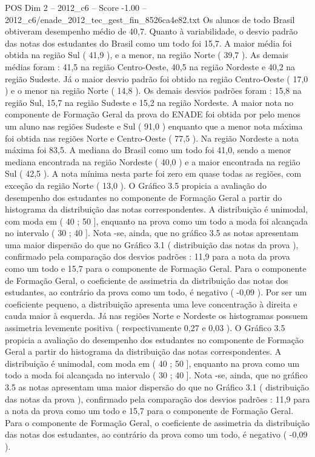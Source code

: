 \begin{textsample}{POS Dim 2 – 2012\_c6 – Score -1.00 – 2012\_c6/enade\_2012\_tec\_gest\_fin\_8526ca4e82.txt}
Os alunos de todo Brasil obtiveram desempenho médio de 40,7.
Quanto à variabilidade, o desvio padrão das notas dos estudantes do Brasil como um todo foi 15,7.
A maior média foi obtida na região Sul ( 41,9 ), e a menor, na região Norte ( 39,7 ).
As demais médias foram : 41,5 na região Centro-Oeste, 40,5 na região Nordeste e 40,2 na região Sudeste.
Já o maior desvio padrão foi obtido na região Centro-Oeste ( 17,0 ) e o menor na região Norte ( 14,8 ).
Os demais desvios padrões foram : 15,8 na região Sul, 15,7 na região Sudeste e 15,2 na região Nordeste.
A maior nota no componente de Formação Geral da prova do ENADE foi obtida por pelo menos um aluno nas regiões Sudeste e Sul ( 91,0 ) enquanto que a menor nota máxima foi obtida nas regiões Norte e Centro-Oeste ( 77,5 ).
Na região Nordeste a nota máxima foi 83,5.
A mediana do Brasil como um todo foi 41,0, sendo a menor mediana encontrada na região Nordeste ( 40,0 ) e a maior encontrada na região Sul ( 42,5 ).
A nota mínima nesta parte foi zero em quase todas as regiões, com exceção da região Norte ( 13,0 ).
O Gráfico 3.5 propicia a avaliação do desempenho dos estudantes no componente de Formação Geral a partir do histograma da distribuição das notas correspondentes.
A distribuição é unimodal, com moda em ( 40 ; 50 ], enquanto na prova como um todo a moda foi alcançada no intervalo ( 30 ; 40 ].
Nota -se, ainda, que no gráfico 3.5 as notas apresentam uma maior dispersão do que no Gráfico 3.1 ( distribuição das notas da prova ), confirmado pela comparação dos desvios padrões : 11,9 para a nota da prova como um todo e 15,7 para o componente de Formação Geral.
Para o componente de Formação Geral, o coeficiente de assimetria da distribuição das notas dos estudantes, ao contrário da prova como um todo, é negativo ( -0,09 ).
Por ser um coeficiente pequeno, a distribuição apresenta uma leve concentração à direita e cauda maior à esquerda.
Já nas regiões Norte e Nordeste os histogramas possuem assimetria levemente positiva ( respectivamente 0,27 e 0,03 ).
O Gráfico 3.5 propicia a avaliação do desempenho dos estudantes no componente de Formação Geral a partir do histograma da distribuição das notas correspondentes.
A distribuição é unimodal, com moda em ( 40 ; 50 ], enquanto na prova como um todo a moda foi alcançada no intervalo ( 30 ; 40 ].
Nota -se, ainda, que no gráfico 3.5 as notas apresentam uma maior dispersão do que no Gráfico 3.1 ( distribuição das notas da prova ), confirmado pela comparação dos desvios padrões : 11,9 para a nota da prova como um todo e 15,7 para o componente de Formação Geral.
Para o componente de Formação Geral, o coeficiente de assimetria da distribuição das notas dos estudantes, ao contrário da prova como um todo, é negativo ( -0,09 ).

\end{textsample}
